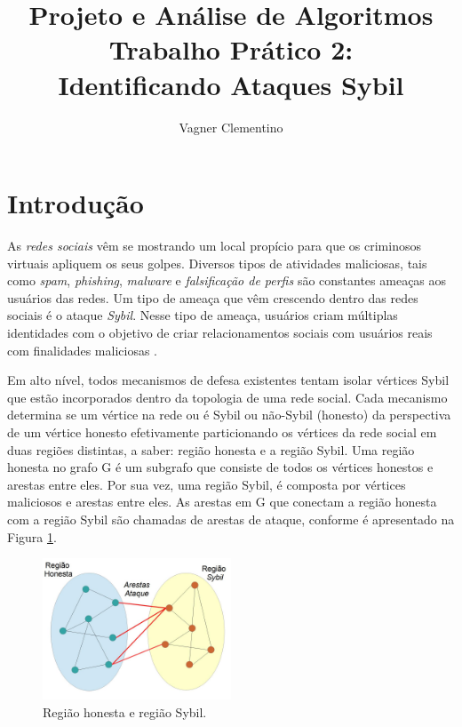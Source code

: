 \documentclass[12pt]{article}
\title{Projeto e Análise de Algoritmos\\ Trabalho Prático 2: \\
Identificando Ataques Sybil}
\author{Vagner Clementino\inst{1}}
\begin{document}
 

\maketitle

     


\section{Introdução}
\label{sec:intro}

As \textit{redes sociais} vêm se mostrando um local propício para que os criminosos virtuais apliquem os seus golpes. Diversos tipos de atividades maliciosas, tais como \textit{spam}, \textit{phishing}, \textit{malware} e \textit{falsificação de perfis} são constantes ameaças aos usuários das redes. Um tipo de ameaça que vêm crescendo dentro das redes sociais é o ataque \textit{Sybil}. Nesse tipo de ameaça, usuários criam múltiplas identidades com o objetivo de criar relacionamentos sociais com usuários reais com finalidades maliciosas \cite{viswanath2011analysis}.

Em alto nível, todos mecanismos de defesa existentes tentam isolar vértices Sybil que estão incorporados dentro da topologia de uma rede social. Cada mecanismo determina se um vértice na rede ou é Sybil ou não-Sybil (honesto) da perspectiva de um vértice honesto efetivamente particionando os vértices da rede social em duas regiões distintas, a saber: região honesta e a região Sybil. Uma região honesta no grafo G é um subgrafo que consiste de todos os vértices honestos e arestas entre eles. Por sua vez, uma região Sybil, é composta por
vértices maliciosos e arestas entre eles. As arestas em G que conectam a região honesta com a região Sybil são chamadas de arestas de ataque, conforme é apresentado na Figura \ref{fig:sybil}.

\begin{figure}[ht]
\centering
\includegraphics[width=0.5\textwidth]{../img/sybil.png}
\caption{Região honesta e região Sybil.}
\label{fig:sybil}
\end{figure}
\end{document}
